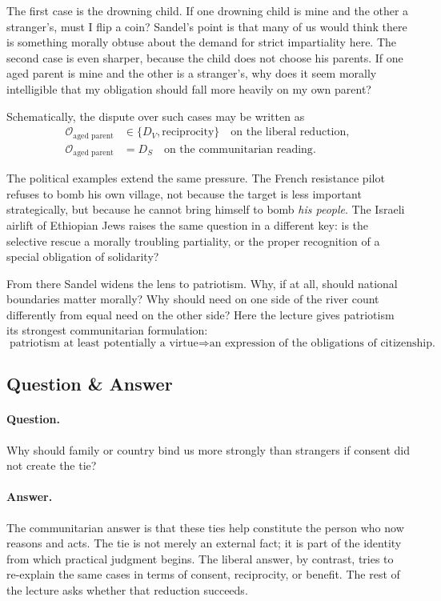 The first case is the drowning child. If one drowning child is mine and the other a stranger's, must I flip a coin? Sandel's point is that many of us would think there is something morally obtuse about the demand for strict impartiality here. The second case is even sharper, because the child does not choose his parents. If one aged parent is mine and the other is a stranger's, why does it seem morally intelligible that my obligation should fall more heavily on my own parent?

Schematically, the dispute over such cases may be written as
\begin{align}
\mathcal{O}_{\text{aged parent}} &\in \{D_V,\text{reciprocity}\} \quad \text{on the liberal reduction}, \\
\mathcal{O}_{\text{aged parent}} &= D_S \quad \text{on the communitarian reading}.
\end{align}

The political examples extend the same pressure. The French resistance pilot refuses to bomb his own village, not because the target is less important strategically, but because he cannot bring himself to bomb \emph{his people}. The Israeli airlift of Ethiopian Jews raises the same question in a different key: is the selective rescue a morally troubling partiality, or the proper recognition of a special obligation of solidarity?

From there Sandel widens the lens to patriotism. Why, if at all, should national boundaries matter morally? Why should need on one side of the river count differently from equal need on the other side? Here the lecture gives patriotism its strongest communitarian formulation:
\begin{equation}
\text{patriotism at least potentially a virtue} \Longrightarrow \text{an expression of the obligations of citizenship.}
\end{equation}

\subsection{Question \& Answer}

\paragraph{Question.} Why should family or country bind us more strongly than strangers if consent did not create the tie?

\paragraph{Answer.} The communitarian answer is that these ties help constitute the person who now reasons and acts. The tie is not merely an external fact; it is part of the identity from which practical judgment begins. The liberal answer, by contrast, tries to re-explain the same cases in terms of consent, reciprocity, or benefit. The rest of the lecture asks whether that reduction succeeds.

